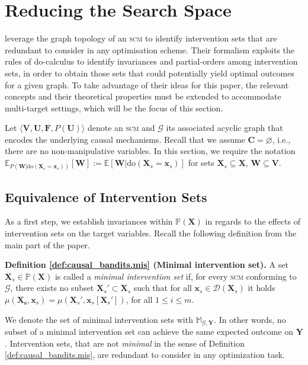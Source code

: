 \section{Reducing the Search Space}\label{appendix:search_space_reduction}
\citet{NEURIPS2018_c0a271bc} leverage the graph topology of an \textsc{scm} to identify intervention sets that are redundant to consider in any optimisation scheme. Their formalism exploits the rules of do-calculus to identify invariances and partial-orders among intervention sets, in order to obtain those sets that could potentially yield optimal outcomes for a given graph. To take advantage of their ideas for this paper, the relevant concepts and their theoretical properties must be extended to accommodate multi-target settings, which will be the focus of this section.

Let $\langle \mathbf{V}, \mathbf{U}, \mathbf{F}, P(\textbf{U}) \rangle$ denote an \textsc{scm} and $\mathcal{G}$ its associated acyclic graph that encodes the underlying causal mechanisms. Recall that we assume $\mathbf{C} = \varnothing$, i.e., there are no non-manipulative variables. In this section, we require the notation $\mathbb{E}_{P(\mathbf{W} | \text{do}(\mathbf{X}_s = \mathbf{x}_s))}[\mathbf{W}] := \mathbb{E}[\mathbf{W} | \text{do}(\mathbf{X}_s = \mathbf{x}_s)]$ for sets $\mathbf{X}_s \subseteq \mathbf{X}$, $\mathbf{W} \subseteq \mathbf{V}$.

\subsection{Equivalence of Intervention Sets}\label{subsec:causal_bandits_mis}

As a first step, we establish invariances within $\mathbb{P}(\mathbf{X})$ in regards to the effects of intervention sets on the target variables. Recall the following definition from the main part of the paper.

\textbf{Definition \ref{def:causal_bandits.mis} \textnormal{(Minimal intervention set)}.} A set $\mathbf{X}_s \in \mathbb{P}(\mathbf{X})$ is called a \textit{minimal intervention set} if, for every \textsc{scm} conforming to $\mathcal{G}$, there exists no subset $\mathbf{X}_s' \subset \mathbf{X}_s$ such that for all $\mathbf{x}_s \in \mathcal{D}(\mathbf{X}_s)$ it holds $\mu(\mathbf{X_s},\mathbf{x}_s) = \mu(\mathbf{X}_s',\mathbf{x}_s[\mathbf{X}_s'])$, for all $1 \leq i \leq m$.

We denote the set of minimal intervention sets with $\mathbb{M}_{\mathcal{G},\mathbf{Y}}$. In other words, no subset of a minimal intervention set can achieve the same expected outcome on $\mathbf{Y}$. Intervention sets, that are not \textit{minimal} in the sense of Definition \ref{def:causal_bandits.mis}, are redundant to consider in any optimization task. 

